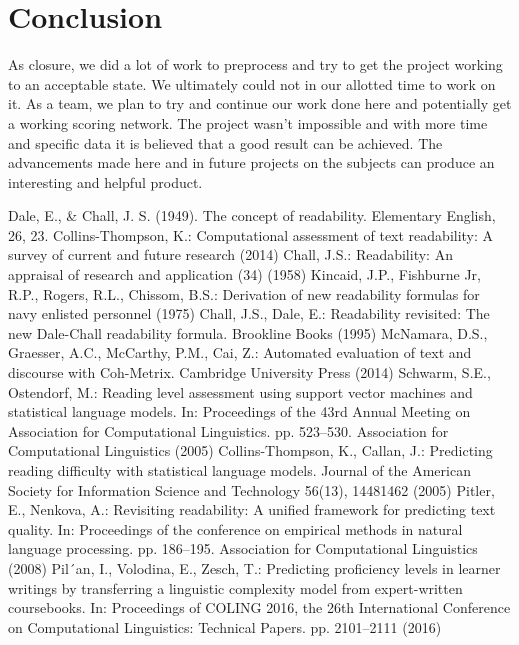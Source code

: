 \documentclass[conference]{IEEEtran}
\begin{document}
\section{Conclusion}
As closure, we did a lot of work to preprocess and try to get the project working to an acceptable state. We ultimately could not in our allotted time to work on it. As a team, we plan to try and continue our work done here and potentially get a working scoring network. The project wasn’t impossible and with more time and specific data it is believed that a good result can be achieved. The advancements made here and in future projects on the subjects can produce an interesting and helpful product.

\begin{thebibliography}{00}
 Dale, E., \& Chall, J. S. (1949). The concept of readability. Elementary English, 26, 23.
 Collins-Thompson, K.: Computational assessment of text readability: A survey of current and future research (2014)
 Chall, J.S.: Readability: An appraisal of research and application (34) (1958)
 Kincaid, J.P., Fishburne Jr, R.P., Rogers, R.L., Chissom, B.S.: Derivation of new readability formulas for navy enlisted personnel (1975)
 Chall, J.S., Dale, E.: Readability revisited: The new Dale-Chall readability formula. Brookline Books (1995)
 McNamara, D.S., Graesser, A.C., McCarthy, P.M., Cai, Z.: Automated evaluation of text and discourse with Coh-Metrix. Cambridge University Press (2014)
 Schwarm, S.E., Ostendorf, M.: Reading level assessment using support vector machines and statistical language models. In: Proceedings of the 43rd Annual Meeting on Association for Computational Linguistics. pp. 523–530. Association for Computational Linguistics (2005)
 Collins-Thompson, K., Callan, J.: Predicting reading difficulty with statistical language models. Journal of the American Society for Information Science and Technology 56(13), 14481462 (2005)
 Pitler, E., Nenkova, A.: Revisiting readability: A unified framework for predicting text quality. In: Proceedings of the conference on empirical methods in natural language processing. pp. 186–195. Association for Computational Linguistics (2008)
 Pil´an, I., Volodina, E., Zesch, T.: Predicting proficiency levels in learner writings by transferring a linguistic complexity model from expert-written coursebooks. In: Proceedings of COLING 2016, the 26th International Conference on Computational Linguistics: Technical Papers. pp. 2101–2111 (2016)

\end{thebibliography}
\end{document}
